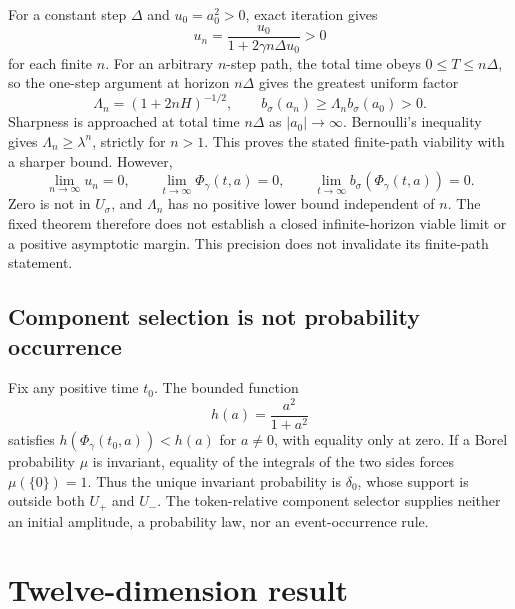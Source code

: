 \documentclass[11pt]{article}
\newcommand{\PhiFlow}{\Phi_{\gamma}}
\begin{document}
For a constant step $\Delta$ and $u_0=a_0^2>0$, exact iteration gives
\[
 u_n=\frac{u_0}{1+2\gamma n\Delta u_0}>0
\]
for each finite $n$.  For an arbitrary $n$-step path, the total time obeys
$0\le T\le n\Delta$, so the one-step argument at horizon $n\Delta$ gives the
greatest uniform factor
\[
 \Lambda_n=(1+2nH)^{-1/2},\qquad
 b_\sigma(a_n)\ge\Lambda_n b_\sigma(a_0)>0.
\]
Sharpness is approached at total time $n\Delta$ as $|a_0|\to\infty$.
Bernoulli's inequality gives $\Lambda_n\ge\lambda^n$, strictly for $n>1$.
This proves the stated finite-path viability with a sharper bound.  However,
\[
 \lim_{n\to\infty}u_n=0,
 \qquad
 \lim_{t\to\infty}\PhiFlow(t,a)=0,
 \qquad
 \lim_{t\to\infty}b_\sigma(\PhiFlow(t,a))=0.
\]
Zero is not in $U_\sigma$, and $\Lambda_n$ has no positive lower bound
independent of $n$.  The fixed theorem therefore does not establish a closed
infinite-horizon viable limit or a positive asymptotic margin.  This precision
does not invalidate its finite-path statement.

\subsection{Component selection is not probability occurrence}

Fix any positive time $t_0$.  The bounded function
\[
 h(a)=\frac{a^2}{1+a^2}
\]
satisfies $h(\PhiFlow(t_0,a))<h(a)$ for $a\ne0$, with equality only at zero.
If a Borel probability $\mu$ is invariant, equality of the integrals of the
two sides forces $\mu(\{0\})=1$.  Thus the unique invariant probability is
$\delta_0$, whose support is outside both $U_+$ and $U_-$.  The token-relative
component selector supplies neither an initial amplitude, a probability law,
nor an event-occurrence rule.

\section{Twelve-dimension result}
\end{document}
